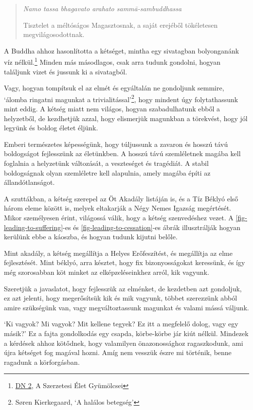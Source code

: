 \begin{quote}
\emph{Namo tassa bhagavato arahato sammā-sambuddhassa}

Tisztelet a méltóságos Magasztosnak, a saját erejéből tökéletesen
megvilágosodottnak.
\end{quote}


A Buddha ahhoz hasonlította a kétséget, mintha egy sivatagban
bolyonganánk víz nélkül.\footnote{\href{https://suttacentral.net/dn2}{DN
  2}, A Szerzetesi Élet Gyümölcsei} Minden más másodlagos, csak arra
tudunk gondolni, hogyan találjunk vizet és jussunk ki a sivatagból.

Vagy, hogyan tompítsuk el az elmét és egyáltalán ne gondoljunk semmire,
`álomba ringatni magunkat a trivialitással'\footnote{Søren Kierkegaard,
  `A halálos betegség'}, hogy mindent úgy folytathassunk mint eddig. A
kétség miatt nem világos, hogyan szabadulhatunk ebből a helyzetből, de
kezdhetjük azzal, hogy elismerjük magunkban a törekvést, hogy jól
legyünk és boldog életet éljünk.

Emberi természetes képességünk, hogy túljussunk a zavaron és hosszú távú
boldogságot fejlesszünk az életünkben. A hosszú távú szemléletnek magába
kell foglalnia a helyzetünk változását, a veszteséget és tragédiát. A
stabil boldogságnak olyan szemléletre kell alapulnia, amely magába építi
az állandótlanságot.

A szuttákban, a kétség szerepel az Öt Akadály listáján is, és a Tíz Béklyó
első három eleme között is, melyek eltakarják a Négy Nemes Igazság
megértését. Mikor személyesen érint, világossá válik, hogy a kétség
szenvedéshez vezet. A \ref{fig-leading-to-suffering}-es és
\ref{fig-leading-to-cessation}-es ábrák illusztrálják hogyan kerülünk
ebbe a káoszba, és hogyan tudunk kijutni belőle.

Mint akadály, a kétség megállítja a Helyes Erőfeszítést, és megállítja
az elme fejlesztését. Mint béklyó, arra késztet, hogy fix
bizonyosságokat keressünk, és így még szorosabban köt minket az
elképzeléseinkhez arról, kik vagyunk.

Szeretjük a javaslatot, hogy fejlesszük az elménket, de kezdetben azt
gondoljuk, ez azt jelenti, hogy megerősítsük kik és mik vagyunk, többet
szerezzünk abból amire szükségünk van, vagy megváltoztassunk magunkat és
valami mássá váljunk.

`Ki vagyok? Mi vagyok? Mit kellene tegyek? Ez itt a megfelelő dolog,
vagy egy másik?' Ez a fajta gondolkodás egy csapda, körbe-körbe jár kiút
nélkül. Mindezek a kérdések ahhoz kötődnek, hogy valamilyen
önazonossághoz ragaszkodunk, ami újra kétséget fog magával hozni. Amíg
nem vesszük észre mi történik, benne ragadunk a körforgásban.

